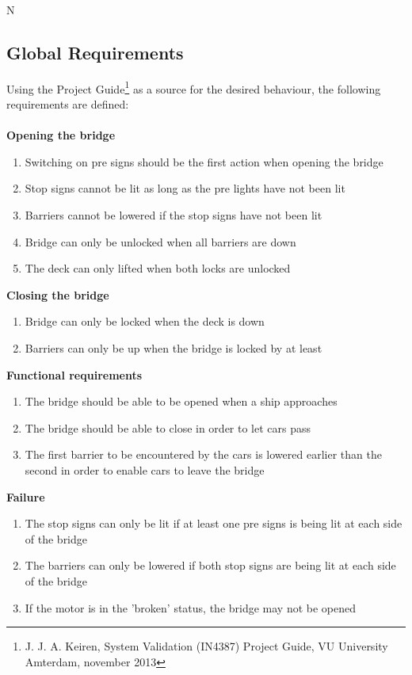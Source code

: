 N\subsection{Global Requirements}
\label{sec:glob}

Using the Project Guide\footnote{J. J. A. Keiren, System Validation (IN4387) Project Guide, VU University Amterdam, november 2013} as a source for the desired behaviour, the following requirements are defined:
\\
\\
\textbf{Opening the bridge}
	\begin{enumerate}
  	\item Switching on pre signs should be the first action when opening the bridge
		\item Stop signs cannot be lit as long as the pre lights have not been lit
		\item Barriers cannot be lowered if the stop signs have not been lit
		\item Bridge can only be unlocked when all barriers are down
		\item The deck can only lifted when both locks are unlocked
   \setcounter{enumTemp}{\theenumi}
 \end{enumerate}
  
\textbf{Closing the bridge}
  \begin{enumerate}
    \setcounter{enumi}{\theenumTemp}
  	\item Bridge can only be locked when the deck is down
		\item Barriers can only be up when the bridge is locked by at least 
		\setcounter{enumTemp}{\theenumi}
  \end{enumerate}
 
\textbf{Functional requirements}
	\begin{enumerate}
	
			\item The bridge should be able to be opened when a ship approaches
			\item The bridge should be able to close in order to let cars pass
			\item The first barrier to be encountered by the cars is lowered earlier than the second in order to enable cars to leave the bridge
		\setcounter{enumTemp}{\theenumi}
	\end{enumerate}

\textbf{Failure}
	\begin{enumerate}
		\setcounter{enumi}{\theenumTemp}
			\item The stop signs can only be lit if at least one pre signs is being lit at each side of the bridge
			\item The barriers can only be lowered if both stop signs are being lit at each side of the bridge
			\item If the motor is in the 'broken' status, the bridge may not be opened
		\setcounter{enumTemp}{\theenumi}
	\end{enumerate}
